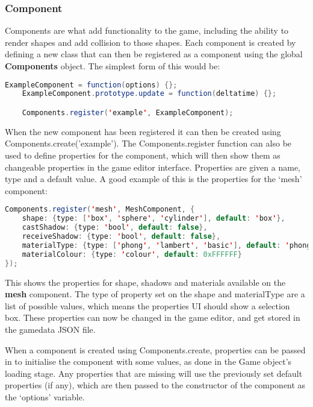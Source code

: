	\subsubsection{Component}
	Components are what add functionality to the game, including the ability to render shapes and add collision to those shapes. Each component is created by defining a new class that can then be registered as a component using the global \textbf{Components} object. The simplest form of this would be:

	\begin{lstlisting}[language=Java]
	ExampleComponent = function(options) {};
	ExampleComponent.prototype.update = function(deltatime) {};

	Components.register('example', ExampleComponent);\end{lstlisting}

	When the new component has been registered it can then be created using Components.create('example'). The Components.register function can also be used to define properties for the component, which will then show them as changeable properties in the game editor interface. Properties are given a name, type and a default value. A good example of this is the properties for the `mesh' component:

	\begin{lstlisting}[language=Java]
Components.register('mesh', MeshComponent, {
	shape: {type: ['box', 'sphere', 'cylinder'], default: 'box'},
	castShadow: {type: 'bool', default: false},
	receiveShadow: {type: 'bool', default: false},
	materialType: {type: ['phong', 'lambert', 'basic'], default: 'phong'},
	materialColour: {type: 'colour', default: 0xFFFFFF}
});\end{lstlisting}

	This shows the properties for shape, shadows and materials available on the \textbf{mesh} component. The type of property set on the shape and materialType are a list of possible values, which means the properties UI should show a selection box. These properties can now be changed in the game editor, and get stored in the gamedata JSON file.

	When a component is created using Components.create, properties can be passed in to initialise the component with some values, as done in the Game object's loading stage. Any properties that are missing will use the previously set default properties (if any), which are then passed to the constructor of the component as the `options' variable.

